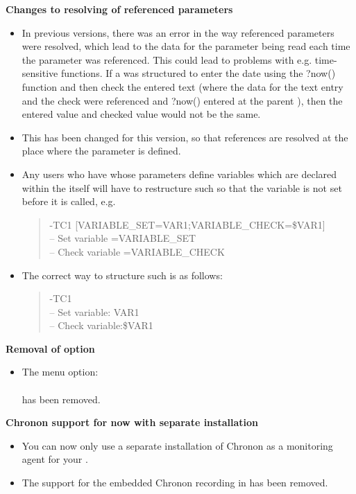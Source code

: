 \textbf{Changes to resolving of referenced parameters}\\
\begin{itemize}
\item In previous versions, there was an error in the way referenced parameters were resolved, which lead to the data for the parameter being read each time the parameter was referenced. This could lead to problems with e.g. time-sensitive functions. If a \gdcase{} was structured to enter the date using the ?now() function and then check the entered text (where the data for the text entry and the check were referenced and ?now() entered at the parent \gdcase{}), then the entered value and checked value would not be the same.
\item This has been changed for this version, so that references are resolved at the place where the parameter is defined. 
\item Any users who have \gdcases{} whose parameters define variables which are declared within the \gdcase{} itself will have to restructure such \gdcases{} so that the variable is not set before it is called, e.g.
\begin{quote}
-TC1 [VARIABLE\_SET=VAR1;VARIABLE\_CHECK=\$VAR1]\\
-- Set variable =VARIABLE\_SET\\
-- Check variable =VARIABLE\_CHECK
\end{quote}
\item The correct way to structure such \gdcases{} is as follows:
\begin{quote}
-TC1\\
-- Set variable: VAR1\\
-- Check variable:\$VAR1
\end{quote}
\end{itemize}

\textbf{Removal of option }
\begin{itemize}
\item The menu option: \\
\\
has been removed.
\end{itemize}

\textbf{Chronon support for \gdauts{} now with separate installation}
\begin{itemize}
\item You can now only use a separate installation of Chronon as a monitoring agent for your \gdaut{}. 
\item The support for the embedded Chronon recording in \gdauts{} has been removed.
\end{itemize}

